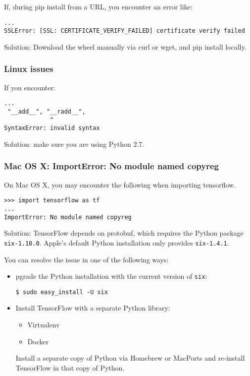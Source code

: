 If, during pip install from a URL, you encounter an error like:

\begin{lstlisting}
...
SSLError: [SSL: CERTIFICATE_VERIFY_FAILED] certificate verify failed
\end{lstlisting}

Solution: Download the wheel manually via curl or wget, and pip install locally.

\subsubsection {Linux issues}

If you encounter:

\begin{lstlisting}
...
 "__add__", "__radd__",
             ^
SyntaxError: invalid syntax
\end{lstlisting}

Solution: make sure you are using Python 2.7.

\subsubsection {Mac OS X: ImportError: No module named copyreg}

On Mac OS X, you may encounter the following when importing tensorflow.

\begin{lstlisting}
>>> import tensorflow as tf
...
ImportError: No module named copyreg
\end{lstlisting}

Solution: TensorFlow depends on protobuf, which requires the Python package \lstinline{six-1.10.0}. Apple's default Python installation only provides \lstinline{six-1.4.1}.

You can resolve the issue in one of the following ways:
\begin{itemize}
\item pgrade the Python installation with the current version of \lstinline{six}:
\begin{lstlisting}
$ sudo easy_install -U six
\end{lstlisting}

\item Install TensorFlow with a separate Python library:
  \begin{itemize}
  \item Virtualenv
  \item Docker
  \end{itemize}
Install a separate copy of Python via Homebrew or MacPorts and re-install TensorFlow in that copy of Python.
\end{itemize}




